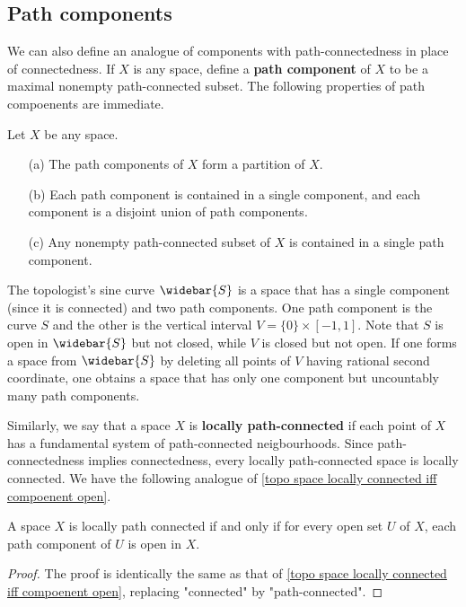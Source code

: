 \subsection{Path components}
We can also define an analogue of components with path-connectedness in place of connectedness. If $X$ is any space, define a \textbf{path component} of $X$ to be a maximal nonempty path-connected subset. The following properties of path compoenents are immediate.
\begin{proposition}
Let $X$ be any space.
\begin{itemize}
\item[(a)] The path components of $X$ form a partition of $X$.
\item[(b)] Each path component is contained in a single component, and each component is a disjoint union of path components.
\item[(c)] Any nonempty path-connected subset of $X$ is contained in a single path component.
\end{itemize}
\end{proposition}
\begin{example}
The topologist's sine curve $\widebar{S}$ is a space that has a single component (since it is connected) and two path components. One path component is the curve $S$ and the other is the vertical interval $V=\{0\}\times[-1,1]$. Note that $S$ is open in $\widebar{S}$ but not closed, while $V$ is closed but not open. If one forms a space from $\widebar{S}$ by deleting all points of $V$ having rational second coordinate, one obtains a space that has only one component but uncountably many path components.
\end{example}
Similarly, we say that a space $X$ is \textbf{locally path-connected} if each point of $X$ has a fundamental system of path-connected neigbourhoods. Since path-connectedness implies connectedness, every locally path-connected space is locally connected. We have the following analogue of \cref{topo space locally connected iff compoenent open}.
\begin{proposition}
A space $X$ is locally path connected if and only if for every open set $U$ of $X$, each path component of $U$ is open in $X$.
\end{proposition}
\begin{proof}
The proof is identically the same as that of \cref{topo space locally connected iff compoenent open}, replacing "connected" by "path-connected".
\end{proof}
